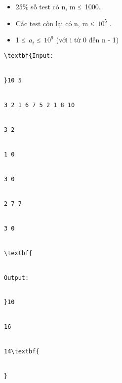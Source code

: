 \begin{itemize}
	\item     25\% số test có n, m ≤ 1000.   
	\item     Các test còn lại có n, m ≤ $10^{5}$    .   
	\item     1 ≤ $a_{i}$    ≤ $10^{9}$    (với i từ 0 đến n - 1)   
\end{itemize}
\begin{verbatim}
\textbf{Input:


}10 5


3 2 1 6 7 5 2 1 8 10


3 2


1 0


3 0


2 7 7


3 0


\textbf{


Output:


}10


16


14\textbf{


}\end{verbatim}